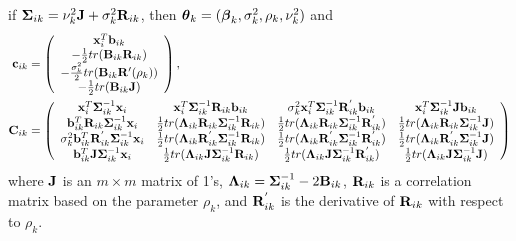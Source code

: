 \begin{theorem}
if $\boldsymbol\Sigma_{ik}=\nu_{k}^{2}\mathbf J +\sigma_{k}^{2}\mathbf R_{ik}$, then $\boldsymbol\theta_{k}=(\boldsymbol\beta_{k},\sigma^{2}_{k},\rho_{k},\nu_{k}^{2})$ and
\begin{align*}
\mathbf c_{ik}&=\left( \begin{array}{c}\mathbf x_{i}^{T}\mathbf b_{ik}\\ -\frac{1}{2}tr( \mathbf B_{ik} \mathbf R_{ik})\\ -\frac{\sigma^{2}_{k}}{2}tr( \mathbf B_{ik} \mathbf R'(\rho_{k}))\\
-\frac{1}{2}tr( \mathbf B_{ik} \mathbf J)
\end{array}\right),\\
\mathbf C_{ik}&=\left(\begin{array}{cccc} \mathbf x_{i}^{T}\boldsymbol\Sigma_{ik}^{-1}\mathbf x_{i}& \mathbf x_{i}^{T}\boldsymbol\Sigma_{ik}^{-1}\mathbf R_{ik}\mathbf b_{ik}&\sigma^{2}_{k}\mathbf x_{i}^{T} \boldsymbol\Sigma^{-1}_{ik}\mathbf R^{'}_{ik}\mathbf b_{ik}&\mathbf x_{i}^{T} \boldsymbol\Sigma_{ik}^{-1}\mathbf J \mathbf b_{ik}\\  
\mathbf b^{T}_{ik}\mathbf R_{ik}\boldsymbol\Sigma_{ik}^{-1}\mathbf x_{i}&\frac{1}{2}tr(\boldsymbol \Lambda_{ik}\mathbf R_{ik}\boldsymbol\Sigma_{ik}^{-1}\mathbf R_{ik})&\frac{1}{2}tr(\boldsymbol \Lambda_{ik}\mathbf R_{ik}\boldsymbol\Sigma_{ik}^{-1}\mathbf R^{'}_{ik})&\frac{1}{2}tr(\boldsymbol \Lambda_{ik}\mathbf R_{ik}\boldsymbol\Sigma_{ik}^{-1}\mathbf J)\\ 
\sigma^{2}_{k}\mathbf b_{ik}^{T}\mathbf R^{'}_{ik} \boldsymbol\Sigma_{ik}^{-1}\mathbf x_{i}&\frac{1}{2}tr(\boldsymbol \Lambda_{ik}\mathbf R^{'}_{ik}\boldsymbol\Sigma_{ik}^{-1}\mathbf R_{ik})&\frac{1}{2}tr(\boldsymbol \Lambda_{ik}\mathbf R^{'}_{ik}\boldsymbol\Sigma_{ik}^{-1}\mathbf R^{'}_{ik})&\frac{1}{2}tr(\boldsymbol \Lambda_{ik}\mathbf R^{'}_{ik}\boldsymbol\Sigma_{ik}^{-1}\mathbf J)\\
 \mathbf b_{ik}^{T}\mathbf J \boldsymbol\Sigma_{ik}^{-1}\mathbf x_{i}&\frac{1}{2}tr(\boldsymbol \Lambda_{ik}\mathbf J\boldsymbol\Sigma_{ik}^{-1}\mathbf R_{ik})&\frac{1}{2}tr(\boldsymbol \Lambda_{ik}\mathbf J\boldsymbol\Sigma_{ik}^{-1}\mathbf R^{'}_{ik})&\frac{1}{2}tr(\boldsymbol \Lambda_{ik}\mathbf J\boldsymbol\Sigma_{ik}^{-1}\mathbf J)
\end{array} \right)
\end{align*}
where $\mathbf J$ is an $m\times m$ matrix of 1's, $\boldsymbol \Lambda_{ik} = \boldsymbol\Sigma_{ik}^{-1}-2\mathbf B_{ik}$, $\mathbf R_{ik}$ is a correlation matrix based on the parameter $\rho_{k}$, and $\mathbf R^{'}_{ik}$ is the derivative of $\mathbf R_{ik}$ with respect to $\rho_{k}$. 
\end{theorem}

